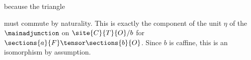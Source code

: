 because the triangle 

\begin{center}
\end{center}

must commute by naturality. This is exactly the component of the unit $\eta$ of the $\mainadjunction$ on $\site{C}{T}{O}/b$ for $\sections{a}{F} \tensor \sections{b}{O}$.
Since $b$ is caffine, this is an isomorphism by assumption.